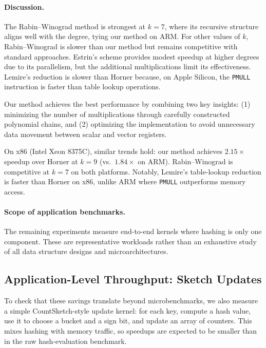 \paragraph{Discussion.}
The Rabin--Winograd method is strongest at $k = 7$, where its recursive structure
aligns well with the degree, tying our method on ARM.
For other values of $k$, Rabin--Winograd is slower than our method but remains competitive
with standard approaches.
Estrin's scheme provides modest speedup at higher degrees due to its parallelism,
but the additional multiplications limit its effectiveness.
Lemire's reduction is slower than Horner because, on Apple Silicon,
the \texttt{PMULL} instruction is faster than table lookup operations.

Our method achieves the best performance by combining two key insights:
(1) minimizing the number of multiplications through carefully constructed polynomial chains,
and (2) optimizing the implementation to avoid unnecessary data movement between
scalar and vector registers.

On x86 (Intel Xeon 8375C), similar trends hold: our method achieves $2.15\times$ speedup
over Horner at $k=9$ (vs.\ $1.84\times$ on ARM).
Rabin--Winograd is competitive at $k=7$ on both platforms.
Notably, Lemire's table-lookup reduction is faster than Horner on x86,
unlike ARM where \texttt{PMULL} outperforms memory access.

\paragraph{Scope of application benchmarks.}
The remaining experiments measure end-to-end kernels where hashing is only one component.
These are representative workloads rather than an exhaustive study of all data structure designs and microarchitectures.

\subsection{Application-Level Throughput: Sketch Updates}
\label{sec:experiments:sketch}

To check that these savings translate beyond microbenchmarks, we also measure a simple
CountSketch-style update kernel: for each key, compute a hash value, use it to choose a bucket
and a sign bit, and update an array of counters.
This mixes hashing with memory traffic, so speedups are expected to be smaller than in the raw
hash-evaluation benchmark.

